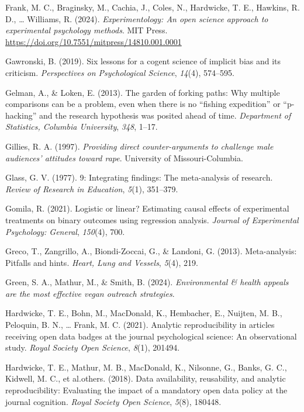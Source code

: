 \documentclass[
  ,jou]{apa6}
\newlength{\cslhangindent}
\newenvironment{CSLReferences}[2] %
 {\begin{list}{}{%
  \setlength{\itemindent}{0pt}
  \setlength{\leftmargin}{0pt}
  \setlength{\parsep}{0pt}
  \ifodd #1
   \setlength{\leftmargin}{\cslhangindent}
   \setlength{\itemindent}{-1\cslhangindent}
  \fi
  \setlength{\itemsep}{#2\baselineskip}}}
 {\end{list}}
\begin{document}
\begin{CSLReferences}{1}{0}
Frank, M. C., Braginsky, M., Cachia, J., Coles, N., Hardwicke, T. E., Hawkins, R. D., \ldots{} Williams, R. (2024). \emph{Experimentology: An open science approach to experimental psychology methods}. MIT Press. \url{https://doi.org/10.7551/mitpress/14810.001.0001}

Gawronski, B. (2019). Six lessons for a cogent science of implicit bias and its criticism. \emph{Perspectives on Psychological Science}, \emph{14}(4), 574--595.

Gelman, A., \& Loken, E. (2013). The garden of forking paths: Why multiple comparisons can be a problem, even when there is no {``fishing expedition''} or {``p-hacking''} and the research hypothesis was posited ahead of time. \emph{Department of Statistics, Columbia University}, \emph{348}, 1--17.

Gillies, R. A. (1997). \emph{Providing direct counter-arguments to challenge male audiences' attitudes toward rape}. University of Missouri-Columbia.

Glass, G. V. (1977). 9: Integrating findings: The meta-analysis of research. \emph{Review of Research in Education}, \emph{5}(1), 351--379.

Gomila, R. (2021). Logistic or linear? Estimating causal effects of experimental treatments on binary outcomes using regression analysis. \emph{Journal of Experimental Psychology: General}, \emph{150}(4), 700.

Greco, T., Zangrillo, A., Biondi-Zoccai, G., \& Landoni, G. (2013). Meta-analysis: Pitfalls and hints. \emph{Heart, Lung and Vessels}, \emph{5}(4), 219.

Green, S. A., Mathur, M., \& Smith, B. (2024). \emph{Environmental \& health appeals are the most effective vegan outreach strategies}.

Hardwicke, T. E., Bohn, M., MacDonald, K., Hembacher, E., Nuijten, M. B., Peloquin, B. N., \ldots{} Frank, M. C. (2021). Analytic reproducibility in articles receiving open data badges at the journal psychological science: An observational study. \emph{Royal Society Open Science}, \emph{8}(1), 201494.

Hardwicke, T. E., Mathur, M. B., MacDonald, K., Nilsonne, G., Banks, G. C., Kidwell, M. C., et al.others. (2018). Data availability, reusability, and analytic reproducibility: Evaluating the impact of a mandatory open data policy at the journal cognition. \emph{Royal Society Open Science}, \emph{5}(8), 180448.


\end{CSLReferences}
\end{document}
